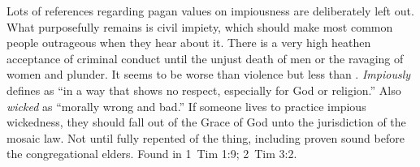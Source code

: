 Lots of references regarding pagan values on impiousness are deliberately left out. What purposefully remains is civil impiety, which should make most common people outrageous when they hear about it. There is a very high heathen acceptance of criminal conduct until the unjust death of men or the ravaging of women and plunder. It seems to be worse than  violence but less than .
 \emph{Impiously} defines as ``in a way that shows no respect, especially for God or religion.'' Also \emph{wicked} as ``morally wrong and bad.'' If someone lives to practice impious wickedness, they should fall out of the Grace of God unto the jurisdiction of the mosaic law. Not until fully repented of the thing, including proven sound before the congregational elders.
Found in 1~Tim 1:9; 2~Tim 3:2.
